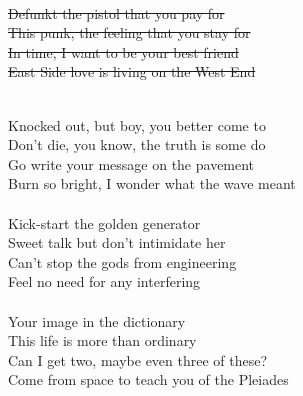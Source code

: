 \begin{footnotesize}
	{\color{gray}\sout{
			\\
			Defunkt the pistol that you pay for \\
			This punk, the feeling that you stay for \\
			In time, I want to be your best friend \\
			East Side love is living on the West End \\
		}}
\end{footnotesize}
\\
Knocked out, but boy, you better come to \\
Don't die, you know, the truth is some do \\
Go write your message on the pavement \\
Burn so bright, I wonder what the wave meant \\
\\
Kick-start the golden generator \\
Sweet talk but don't intimidate her \\
Can't stop the gods from engineering \\
Feel no need for any interfering \\
\\
Your image in the dictionary \\
This life is more than ordinary \\
Can I get two, maybe even three of these? \\
Come from space to teach you of the Pleiades \\
\\
